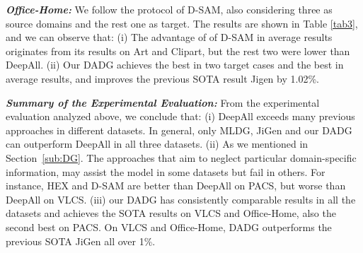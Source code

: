 \documentclass[twocolumn,preprint]{elsarticle}
\begin{document}
\textit{\textbf{Office-Home:}} We follow the protocol of D-SAM, also considering three as source domains and the rest one as target. The results are shown in Table \ref{tab3}, and we can observe that: 
(i) The advantage of of D-SAM in average results originates from its results on Art and Clipart, but the rest two were lower than DeepAll. 
(ii) Our DADG achieves the best in two target cases and the best in average results, and improves the previous SOTA result Jigen by 1.02\%. 

\begin{table}
  \renewcommand\arraystretch{1.1}
  \caption{Cross domain classification accuracy (in \%) on Office-Home dataset when using ResNet-18. The results of our implementation were the average over 20 repetitions. Each column name indicates the target domain. Best performance in bold.}
  \label{tab3}
\end{table}
\noindent
\textit{\textbf{Summary of the Experimental Evaluation:}}  \label{sub:summary} From the experimental evaluation analyzed above, we conclude that: 
(i) DeepAll exceeds many previous approaches in different datasets. In general, only MLDG, JiGen and our DADG can outperform DeepAll in all three datasets. 
(ii) As we mentioned in Section~\ref{sub:DG}. The approaches that aim to neglect particular domain-specific information, may assist the model in some datasets but fail in others. For instance, HEX and D-SAM are better than DeepAll on PACS, but worse than DeepAll on VLCS. 
(iii) our DADG has consistently comparable results in all the datasets and achieves the SOTA results on VLCS and Office-Home, also the second best on PACS. On VLCS and Office-Home, DADG outperforms the previous SOTA JiGen all over 1\%.
\end{document}
